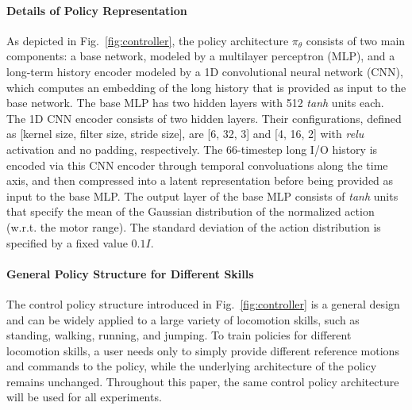 \paragraph{Details of Policy Representation}
As depicted in Fig.~\ref{fig:controller}, the policy architecture $\pi_\theta$ consists of two main components: a base network, modeled by a multilayer perceptron (MLP), and a long-term history encoder modeled by a 1D convolutional neural network (CNN), which computes an embedding of the long history that is provided as input to the base network.  
The base MLP has two hidden layers with 512 \textit{tanh} units each. 
The 1D CNN encoder consists of two hidden layers. 
Their configurations, defined as [kernel size, filter size, stride size], are [6, 32, 3] and [4, 16, 2] with \textit{relu} activation and no padding, respectively. 
The 66-timestep long I/O history is encoded via this CNN encoder through temporal convoluations along the time axis, and then compressed into a latent representation before being provided as input to the base MLP.
The output layer of the base MLP consists of \textit{tanh} units that specify the mean of the Gaussian distribution of the normalized action (w.r.t. the motor range). 
The standard deviation of the action distribution is specified by a fixed value $0.1I$.

\paragraph{General Policy Structure for Different Skills}
The control policy structure introduced in Fig.~\ref{fig:controller} is a general design and can be widely applied to a large variety of locomotion skills, such as standing, walking, running, and jumping. 
To train policies for different locomotion skills, a user needs only to simply provide different reference motions and commands to the policy, while the underlying architecture of the policy remains unchanged.
Throughout this paper, the same control policy architecture will be used for all experiments.
